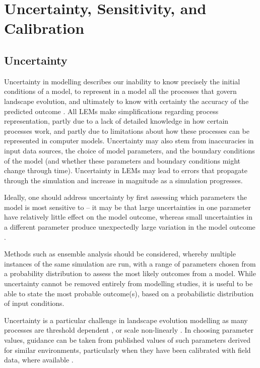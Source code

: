 \section{Uncertainty, Sensitivity, and Calibration}

\subsection{Uncertainty}
Uncertainty in modelling describes our inability to know precisely the initial conditions of a model, to represent in a model all the processes that govern landscape evolution, and ultimately to know with certainty the accuracy of the predicted outcome \citep{Beven1996,pelletier2015forecasting}. All LEMs make simplifications regarding process representation, partly due to a lack of detailed knowledge in how certain processes work, and partly due to limitations about how these processes can be represented in computer models.  Uncertainty may also stem from inaccuracies in input data sources, the choice of model parameters, and the boundary conditions of the model (and whether these parameters and boundary conditions might change through time). Uncertainty in LEMs may lead to errors that propagate through the simulation and increase in magnitude as a simulation progresses. 

Ideally, one should address uncertainty by first assessing which parameters the model is most sensitive to -- it may be that large uncertainties in one parameter have relatively little effect on the model outcome, whereas small uncertainties in a different parameter produce unexpectedly large variation in the model outcome \citep{pelletier2015forecasting}.

Methods such as ensemble analysis should be considered, whereby multiple instances of the same simulation are run, with a range of parameters chosen from a probability distribution to assess the most likely outcomes from a model. While uncertainty cannot be removed entirely from modelling studies, it is useful to be able to state the most probable outcome(s), based on a probabilistic distribution of input conditions.

Uncertainty is a particular challenge in landscape evolution modelling as many processes are threshold dependent \citep{snyder2003importance}, or scale non-linearly \citep{schumm1979geomorphic}. In choosing parameter values, guidance can be taken from published values of such parameters derived for similar environments, particularly when they have been calibrated with field data, where available \citep[e.g][]{Temme2011,Hancock2015,Mudd2014}.

